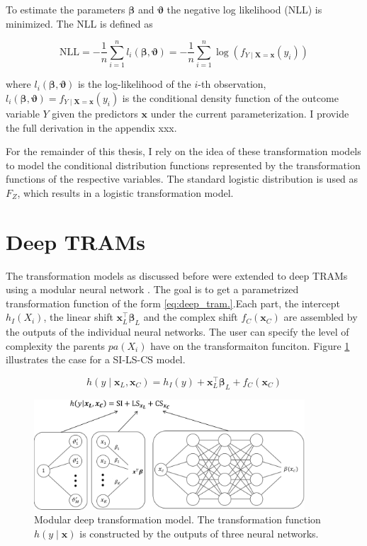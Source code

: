 To estimate the parameters $\boldsymbol{\beta}$ and $\boldsymbol{\vartheta}$ the negative log likelihood (NLL) is minimized. The NLL is defined as

\begin{equation}
\text{NLL} = - \frac{1}{n} \sum_{i=1}^{n} l_i(\boldsymbol{\beta}, \boldsymbol{\vartheta} ) = - \frac{1}{n} \sum_{i=1}^{n} \log (f_{Y \mid \mathbf{X} = \mathbf{x}}(y_i))
\label{eq:nll_tram}
\end{equation}

where $l_i(\boldsymbol{\beta}, \boldsymbol{\vartheta})$ is the log-likelihood of the $i$-th observation,  $l_i(\boldsymbol{\beta}, \boldsymbol{\vartheta}) = f_{Y \mid \mathbf{X} = \mathbf{x}}(y_i)$ is the conditional density function of the outcome variable $Y$ given the predictors $\mathbf{x}$ under the current parameterization. I provide the full derivation in the appendix xxx.


For the remainder of this thesis, I rely on the idea of these transformation models to model the conditional distribution functions represented by the transformation functions of the respective variables. The standard logistic distribution is used as $F_Z$, which results in a logistic transformation model.


\section{Deep TRAMs} \label{sec:deep_trams}

The transformation models as discussed before were extended to deep TRAMs using a modular neural network \citep{sick2020}. The goal is to get a parametrized transformation function of the form \ref{eq:deep_tram.}.Each part, the intercept $h_I(X_i)$, the linear shift $\mathbf{x}_L^\top \boldsymbol{\beta}_L$ and the complex shift $f_C(\mathbf{x}_C)$ are assembled by the outputs of the individual neural networks. The user can specify the level of complexity the parents $pa(X_i)$ have on the transformaiton funciton. Figure \ref{fig:deep_tram} illustrates the case for a SI-LS-CS model.

\begin{equation}
h(y \mid \mathbf{x}_L, \mathbf{x}_C ) = h_I(y) + \mathbf{x}_L^\top \boldsymbol{\beta}_L + f_C(\mathbf{x}_C)
\label{eq:deep_tram}
\end{equation}



\begin{figure}[H]
\centering
\includegraphics[width=0.9\textwidth]{img/deep_tram.png}
\caption{Modular deep transformation model. The transformation function $h(y \mid \mathbf{x})$ is constructed by the outputs of three neural networks.}
\label{fig:deep_tram}
\end{figure}

